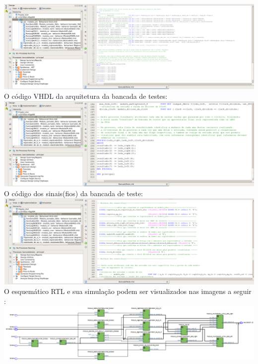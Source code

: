 \documentclass[11pt]{book}
\begin{document}
\newline\newline
\includegraphics[width=1.1\textwidth]{Codigo_Map.png}
\newline
O código VHDL da arquitetura da bancada de testes:
\newline\newline
\includegraphics[width=1.1\textwidth]{Codigo_Arquitetura.png}
\newline
O código dos sinais(fios) da bancada de teste:
\newline\newline
\includegraphics[width=1.1\textwidth]{Codigo_Sinais.png}
\newline
\newpage O esquemático RTL e sua simulação podem ser visualizados nas imagens a seguir :
\newline
\newline
\includegraphics[width=1.1\textwidth]{Esquematico_RTL.png}%
\end{document}
